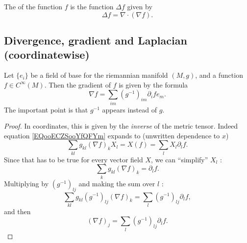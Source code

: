 The  of the function $f$ is the function $\Delta f$ given by
\begin{equation}
\Delta f=\nabla\cdot(\nabla f).
\end{equation}

\subsection{Divergence, gradient and Laplacian (coordinatewise)}

\begin{proposition}
    Let \( \{ e_i \}\) be a field of base for the riemannian manifold \( (M,g)\), and a function \( f\in C^{\infty}(M)\). Then the gradient of \( f\) is given by the formula
    \begin{equation}
        \nabla f=\sum_{im}(g^{-1})_{im}\partial_ife_m.
    \end{equation}
    The important point is that \( g^{-1}\) appears instead of \( g\).
\end{proposition}

\begin{proof}
    In coordinates, this is given by the \emph{inverse} of the metric tensor. Indeed equation \eqref{EQooECZSooYfQFYm} expands to (unwritten dependence to \( x\))
    \begin{equation}
        \sum_{kl}g_{kl}(\nabla f)_kX_l=X(f)=\sum_lX_l\partial_lf.
    \end{equation}
    Since that has to be true for every vector field \( X\), we can ``simplify'' \( X_l\) :
    \begin{equation}
        \sum_kg_{kl}(\nabla f)_k=\partial_lf.
    \end{equation}
    Multiplying by \( (g^{-1})_{lj}\) and making the sum over \( l\) :
    \begin{equation}
        \sum_{kl}g_{kl}(g^{-1})_{lj}(\nabla f)_k=\sum_l(g^{-1})_{lj}\partial_lf,
    \end{equation}
    and then
    \begin{equation}
        (\nabla f)_j=\sum_l(g^{-1})_{lj}\partial_lf.
    \end{equation}
\end{proof}

